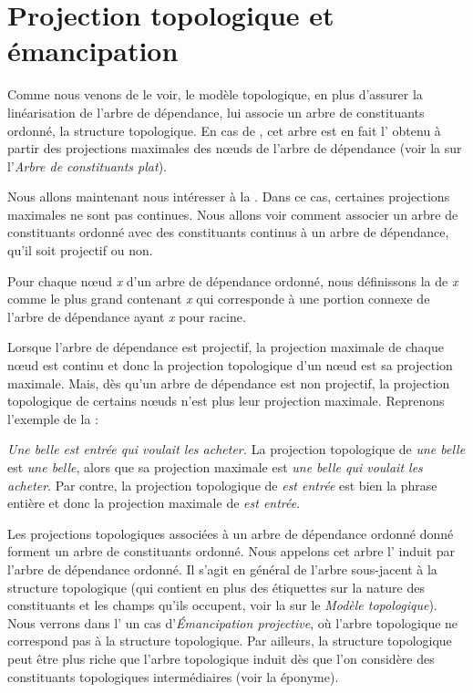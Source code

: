 \section{Projection topologique et émancipation}\label{sec:3.5.30}%

Comme nous venons de le voir, le modèle topologique, en plus d’assurer la linéarisation de l’arbre de dépendance, lui associe un arbre de constituants ordonné, la structure topologique. En cas de , cet arbre est en fait l’ obtenu à partir des projections maximales des nœuds de l’arbre de dépendance (voir la  sur l'\textit{Arbre de constituants plat}).

Nous allons maintenant nous intéresser à la . Dans ce cas, certaines projections maximales ne sont pas continues. Nous allons voir comment associer un arbre de constituants ordonné avec des constituants continus à un arbre de dépendance, qu’il soit projectif ou non.

{Pour chaque nœud \textit{x} d’un arbre de dépendance ordonné, nous définissons la  de \textit{x} comme le plus grand  contenant \textit{x} qui corresponde à une portion connexe de l’arbre de dépendance ayant \textit{x} pour racine.}

Lorsque l’arbre de dépendance est projectif, la projection maximale de chaque nœud est continu et donc la projection topologique d’un nœud est sa projection maximale. Mais, dès qu’un arbre de dépendance est non projectif, la projection topologique de certains nœuds n’est plus leur projection maximale. Reprenons l’exemple  de la  :

\ea\label{ex:belle}
    \textit{{Une belle est entrée qui voulait les acheter}.}
\z
La projection topologique de \textit{une belle} est \textit{une belle}, alors que sa projection maximale est \textit{une belle qui voulait les acheter}. Par contre, la projection topologique de \textit{est entrée} est bien la phrase entière et donc la projection maximale de \textit{est entrée}.

Les projections topologiques associées à un arbre de dépendance ordonné don\-né forment un arbre de constituants ordonné. Nous appelons cet arbre l’ induit par l’arbre de dépendance ordonné. Il s'agit en général de l'arbre sous-jacent à la structure topologique (qui contient en plus des étiquettes sur la nature des constituants et les champs qu'ils occupent, voir la  sur le {\textit{Modèle topologique}}). Nous verrons dans l' un cas d'\textit{Émanci\-pa\-tion projective}, où l'arbre topologique ne correspond pas à la structure topologique. Par ailleurs, la structure topologique peut être plus riche que l'arbre topologique induit dès que l'on considère des constituants topologiques intermédiaires (voir la  éponyme).

